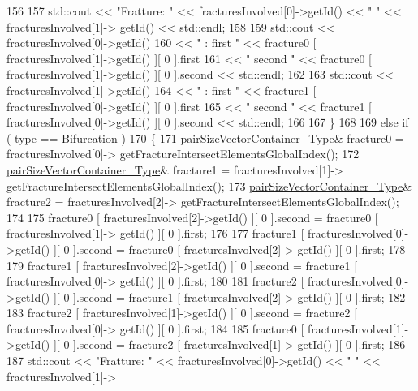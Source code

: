 \begin{DoxyCode}
156 
157             std::cout << \textcolor{stringliteral}{"Fratture: "} << fracturesInvolved[0]->getId() << \textcolor{stringliteral}{"     "} << fracturesInvolved[1]->
      getId() << std::endl;
158 
159             std::cout << fracturesInvolved[0]->getId()
160                             << \textcolor{stringliteral}{" :   first "} << fracture0 [ fracturesInvolved[1]->getId() ][ 0 ].first
161                             << \textcolor{stringliteral}{" second "} << fracture0 [ fracturesInvolved[1]->getId() ][ 0 ].second << 
      std::endl;
162 
163             std::cout << fracturesInvolved[1]->getId()
164                             << \textcolor{stringliteral}{" :   first "} << fracture1 [ fracturesInvolved[0]->getId() ][ 0 ].first
165                             << \textcolor{stringliteral}{" second "} << fracture1 [ fracturesInvolved[0]->getId() ][ 0 ].second << 
      std::endl;
166 
167         \}
168 
169         \textcolor{keywordflow}{else} \textcolor{keywordflow}{if} ( type == \hyperlink{classFractureIntersect_a9a4e4a784fa4c8e359767ed543f89dc5a4d466b3d3de0af7e18732b6f765bb1af}{Bifurcation} )
170         \{    
171             \hyperlink{Core_8h_a9bc476e433f99b82a9c2b8560735c7b5}{pairSizeVectorContainer\_Type}& fracture0 = fracturesInvolved[0]->
      getFractureIntersectElementsGlobalIndex();
172             \hyperlink{Core_8h_a9bc476e433f99b82a9c2b8560735c7b5}{pairSizeVectorContainer\_Type}& fracture1 = fracturesInvolved[1]->
      getFractureIntersectElementsGlobalIndex();
173             \hyperlink{Core_8h_a9bc476e433f99b82a9c2b8560735c7b5}{pairSizeVectorContainer\_Type}& fracture2 = fracturesInvolved[2]->
      getFractureIntersectElementsGlobalIndex();
174             
175             fracture0 [ fracturesInvolved[2]->getId() ][ 0 ].second = fracture0 [ fracturesInvolved[1]->
      getId() ][ 0 ].first;
176  
177             fracture1 [ fracturesInvolved[0]->getId() ][ 0 ].second = fracture0 [ fracturesInvolved[2]->
      getId() ][ 0 ].first;
178  
179             fracture1 [ fracturesInvolved[2]->getId() ][ 0 ].second = fracture1 [ fracturesInvolved[0]->
      getId() ][ 0 ].first;
180  
181             fracture2 [ fracturesInvolved[0]->getId() ][ 0 ].second = fracture1 [ fracturesInvolved[2]->
      getId() ][ 0 ].first;
182  
183             fracture2 [ fracturesInvolved[1]->getId() ][ 0 ].second = fracture2 [ fracturesInvolved[0]->
      getId() ][ 0 ].first;
184  
185             fracture0 [ fracturesInvolved[1]->getId() ][ 0 ].second = fracture2 [ fracturesInvolved[1]->
      getId() ][ 0 ].first;
186  
187             std::cout << \textcolor{stringliteral}{"Fratture: "} << fracturesInvolved[0]->getId() << \textcolor{stringliteral}{"     "} << fracturesInvolved[1]->

\end{DoxyCode}
